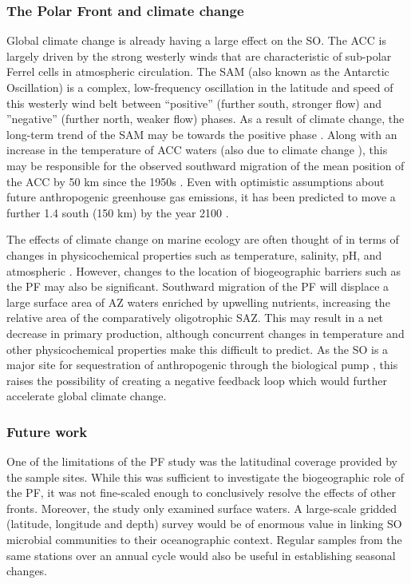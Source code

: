 \subsubsection{The Polar Front and climate change}

Global climate change is already having a large effect on the \ac{SO}.
The \ac{ACC} is largely driven by the strong westerly winds that are characteristic of sub-polar Ferrel cells in atmospheric circulation.
The \ac{SAM} (also known as the Antarctic Oscillation) is a complex, low-frequency oscillation in the latitude and speed of this westerly wind belt between ``positive'' (further south, stronger flow) and ''negative'' (further north, weaker flow) phases.
As a result of climate change, the long-term trend of the \ac{SAM} may be towards the positive phase \cite{Thompson:2002ic}.
Along with an increase in the temperature of \ac{ACC} waters (also due to climate change \cite{Aoki:2003fo,Boning:2008il}), this may be responsible for the observed southward migration of the mean position of the \ac{ACC} by \textapprox{}50 km since the 1950s \cite{Gille:2002fr}.
Even with optimistic assumptions about future anthropogenic greenhouse gas emissions, it has been predicted to move a further \textapprox{}1.4\textdegree{} south (\textapprox{}150 km) by the year 2100 \cite{Fyfe:2005vp}.

The effects of climate change on marine ecology are often thought of in terms of changes in physicochemical properties such as temperature, salinity, pH, and atmospheric .
However, changes to the location of biogeographic barriers such as the \ac{PF} may also be significant.
Southward migration of the \ac{PF} will displace a large surface area of \ac{AZ} waters enriched by upwelling nutrients, increasing the relative area of the comparatively oligotrophic \ac{SAZ}.
This may result in a net decrease in primary production, although concurrent changes in temperature and other physicochemical properties make this difficult to predict.
As the \ac{SO} is a major site for sequestration of anthropogenic  through the biological pump \cite{Thomalla:2011hi}, this raises the possibility of creating a negative feedback loop \cite{Cox:2000ko} which would further accelerate global climate change.

\subsubsection{Future work}

One of the limitations of the \ac{PF} study was the latitudinal coverage provided by the sample sites.
While this was sufficient to investigate the biogeographic role of the \ac{PF}, it was not fine-scaled enough to conclusively resolve the effects of other fronts.
Moreover, the study only examined surface waters.
A large-scale gridded (latitude, longitude and depth) survey would be of enormous value in linking \ac{SO} microbial communities to their oceanographic context.
Regular samples from the same stations over an annual cycle would also be useful in establishing seasonal changes.

